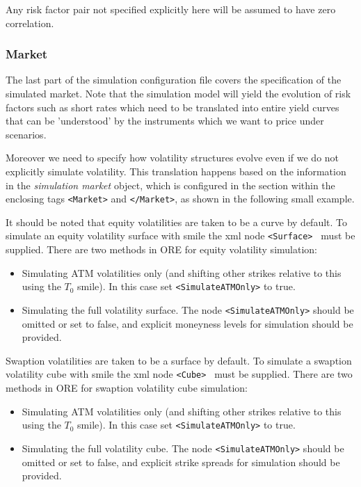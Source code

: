 \documentclass[12pt, a4paper]{article}
\begin{document}
Any risk factor pair not specified explicitly here will be assumed to have zero correlation.

\subsubsection{Market}\label{sec:sim_market}

The last part of the simulation configuration file covers the specification of the simulated market.  Note that the
simulation model will yield the evolution of risk factors such as short rates which need to be translated into entire
yield curves that can be 'understood' by the instruments which we want to price under scenarios.  

Moreover we need to specify how volatility structures evolve even if we do not explicitly simulate volatility. This 
translation happens based on the information in the {\em simulation market} object, which is configured in the section 
within the enclosing tags {\tt <Market>} and {\tt </Market>}, as shown in the following small example.

It should be noted that equity volatilities are taken to be a curve by default. To simulate an equity volatility surface with smile the xml node {\tt <Surface> } must be supplied.
There are two methods in ORE for equity volatility simulation: 
\begin{itemize}
\item Simulating ATM volatilities only (and shifting other strikes relative to this using the $T_{0}$ smile). In this case set {\tt <SimulateATMOnly>} to true.
\item Simulating the full volatility surface. The node {\tt <SimulateATMOnly>} should be omitted or set to false, and explicit moneyness levels for simulation should be provided.
\end{itemize}

Swaption volatilities are taken to be a surface by default. To simulate a swaption volatility cube with smile the xml node {\tt <Cube> } must be supplied.
There are two methods in ORE for swaption volatility cube simulation: 
\begin{itemize}
\item Simulating ATM volatilities only (and shifting other strikes relative to this using the $T_{0}$ smile). In this case set {\tt <SimulateATMOnly>} to true.
\item Simulating the full volatility cube. The node {\tt <SimulateATMOnly>} should be omitted or set to false, and explicit strike spreads for simulation should be provided.
\end{itemize}
\end{document}

